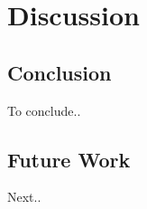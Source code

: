\section{Discussion}
\label{sec:discussion}

\subsection{Conclusion}

To conclude..


\subsection{Future Work}
Next..